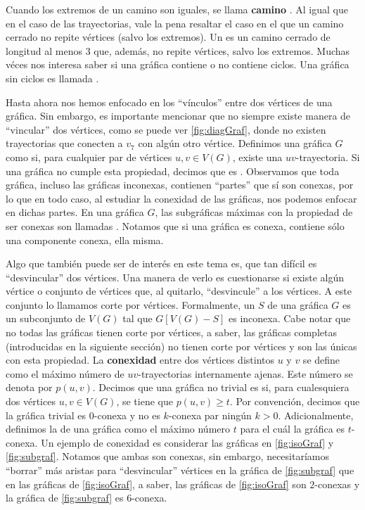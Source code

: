 Cuando los extremos de un camino son iguales, se llama \textbf{camino}
. Al igual que en el caso de las trayectorias, vale
la pena resaltar el caso en el que un camino cerrado no repite v\'ertices (salvo
los extremos). Un  es un camino cerrado de longitud al menos $3$
que, adem\'as, no repite v\'ertices, salvo los extremos.  Muchas v\'eces nos
interesa saber si una gr\'afica contiene o no contiene ciclos.   Una gr\'afica
sin ciclos es llamada .
   
Hasta ahora nos hemos enfocado en los ``v\'inculos'' entre dos v\'ertices de una
gr\'afica. Sin embargo, es importante mencionar que no siempre existe manera de
``vincular'' dos v\'ertices, como se puede ver \cref{fig:diagGraf}, donde no
existen trayectorias que conecten a $v_7$ con alg\'un otro v\'ertice.  Definimos
una gr\'afica $G$ como  si,
para cualquier par de v\'ertices $u,v \in V(G)$, existe una $uv$-trayectoria. Si
una gr\'afica no cumple esta propiedad, decimos que es
. Observamos que toda gr\'afica, incluso las
gr\'aficas inconexas, contienen ``partes'' que s\'i son conexas, por lo que en
todo caso, al estudiar la conexidad de las gr\'aficas, nos podemos enfocar en
dichas partes. En una gr\'afica $G$, las subgr\'aficas m\'aximas con la
propiedad de ser conexas son llamadas . Notamos que si una gr\'afica es conexa,
contiene s\'olo una componente conexa, ella misma. 

Algo que tambi\'en puede ser de inter\'es en este tema es, que tan dif\'icil es
``desvincular'' dos v\'ertices. Una manera de verlo es cuestionarse si existe
alg\'un v\'ertice o conjunto de v\'ertices que, al quitarlo, ``desvincule'' a
los v\'ertices. A este conjunto lo llamamos corte por v\'ertices. Formalmente,
un  $S$ de una gr\'afica $G$ es un subconjunto de
$V(G)$ tal que $G[V(G)-S]$ es inconexa. Cabe notar que no todas las gr\'aficas
tienen corte por v\'ertices, a saber, las gr\'aficas completas (introducidas en
la siguiente secci\'on) no tienen corte por v\'ertices y son las \'unicas con
esta propiedad.
La \textbf{conexidad}  entre dos v\'ertices distintos $u$ y $v$ se define
como el m\'aximo n\'umero de $uv$-trayectorias internamente ajenas. Este
n\'umero se denota por $p(u,v)$. Decimos que una gr\'afica no trivial es
 si, para cualesquiera dos v\'ertices $u,v \in
V(G)$, se tiene que $p(u,v) \geq t$. Por convenci\'on, decimos que la gr\'afica
trivial es $0$-conexa y no es $k$-conexa par ning\'un $k > 0$. Adicionalmente,
definimos la  de una gr\'afica como el m\'aximo n\'umero $t$
para el cu\'al la gr\'afica es $t$-conexa. Un ejemplo de conexidad es considerar
las gr\'aficas en \cref{fig:isoGraf} y \cref{fig:subgraf}. Notamos que ambas son
conexas, sin embargo, necesitar\'iamos ``borrar'' m\'as aristas para
``desvincular'' v\'ertices en la gr\'afica de \cref{fig:subgraf} que en las
gr\'aficas de \cref{fig:isoGraf}, a saber, las gr\'aficas de \cref*{fig:isoGraf}
son $2$-conexas y la gr\'afica de \cref{fig:subgraf} es $6$-conexa.

